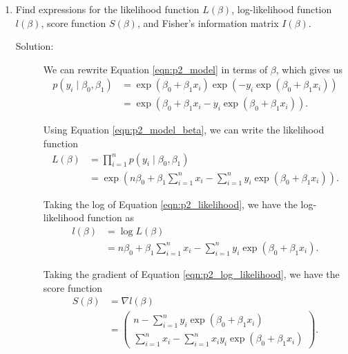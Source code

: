 \documentclass[letterpaper,11pt]{article}
\begin{document}
\begin{enumerate}
  \begin{enumerate}
  \item Find expressions for the likelihood function $L\left(\beta\right)$,
    log-likelihood function $l\left(\beta\right)$, score function
    $S\left(\beta\right)$, and Fisher's information matrix $I\left(\beta\right)$.

    \begin{description}
    \item[Solution:] We can rewrite Equation \ref{eqn:p2_model} in terms of
      $\beta$, which gives us
      \begin{align}
        p\left(y_i \mid \beta_0,\beta_1\right)
        &= \exp\left(\beta_0 + \beta_1x_i\right)
        \exp\left(- y_i\exp\left(\beta_0 + \beta_1x_i\right)\right) \nonumber\\
        &=
        \exp\left(
          \beta_0 + \beta_1x_i - y_i\exp\left(\beta_0 + \beta_1x_i\right)\right)
        \label{eqn:p2_model_beta}.
      \end{align}

      Using Equation \ref{eqn:p2_model_beta}, we can write the likelihood
      function
      \begin{align}
        L\left(\beta\right)
        &= \prod_{i=1}^n p\left(y_i \mid \beta_0,\beta_1\right) \nonumber\\
        &= \exp\left(
          n\beta_0 + \beta_1\sum_{i=1}^n x_i
          -
          \sum_{i=1}^n y_i\exp\left(\beta_0 + \beta_1x_i\right)
          \right).
          \label{eqn:p2_likelihood}
      \end{align}

      Taking the log of Equation \ref{eqn:p2_likelihood}, we have the
      log-likelihood function as
      \begin{align}
        l\left(\beta\right)
        &= \log L\left(\beta\right) \nonumber\\
        &= n\beta_0 + \beta_1\sum_{i=1}^nx_i -
          \sum_{i=1}^ny_i\exp\left(\beta_0 + \beta_1x_i\right).
          \label{eqn:p2_log_likelihood}
      \end{align}

      Taking the gradient of Equation \ref{eqn:p2_log_likelihood}, we have the
      score function
      \begin{align}
        S\left(\beta\right)
        &= \nabla l\left(\beta\right) \nonumber\\
        &= \begin{pmatrix}
          n - \sum_{i=1}^ny_i\exp\left(\beta_0 + \beta_1x_i\right) \\
          \sum_{i=1}^nx_i - \sum_{i=1}^n x_iy_i\exp\left(\beta_0 + \beta_1x_i\right)
        \end{pmatrix}.
        \label{eqn:p2_score}
      \end{align}


\end{description}
\end{enumerate}
\end{enumerate}
\end{document}

